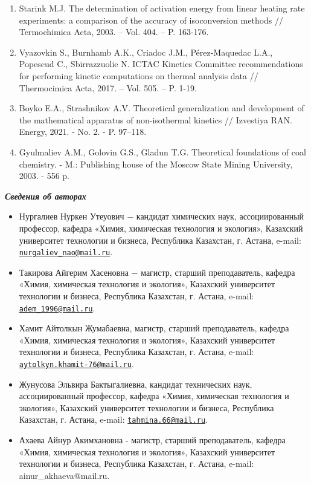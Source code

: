 \begin{enumerate}
\item
Starink M.J. The determination of activation energy from linear
heating rate experiments: a comparison of the accuracy of isoconversion
methods // Termochimica Acta, 2003. -- Vol. 404. -- P. 163-176.

\item
Vyazovkin S., Burnhamb A.K., Criadoc J.M., Pérez-Maquedac L.A.,
Popescud C., Sbirrazzuolie N. ICTAC Kinetics Committee recommendations
for performing kinetic computations on thermal analysis data //
Thermocimica Acta, 2017. -- Vol. 505. -- P. 1-19.

\item
Boyko E.A., Strashnikov A.V. Theoretical generalization and
development of the mathematical apparatus of non-isothermal kinetics //
Izvestiya RAN. Energy, 2021. - No. 2. - P. 97--118.

\item
Gyulmaliev A.M., Golovin G.S., Gladun T.G. Theoretical foundations
of coal chemistry. - M.: Publishing house of the Moscow State Mining
University, 2003. - 556 p.
\end{enumerate}

\emph{{\bfseries Сведения об авторах}}


\begin{itemize}
\item
Нургалиев Нуркен Утеуович − кандидат химических наук, ассоциированный
профессор, кафедра «Химия, химическая технология и экология», Казахский
университет технологии и бизнеса, Республика Казахстан, г. Астана,
e-mail:
\href{mailto:nurgaliev_nao@mail.ru}{\nolinkurl{nurgaliev\_nao@mail.ru}}.

\item
Такирова Айгерим Хасеновна − магистр, старший преподаватель, кафедра
«Химия, химическая технология и экология», Казахский университет
технологии и бизнеса, Республика Казахстан, г. Астана, e-mail:
\href{mailto:adem_1996@mail.ru}{\nolinkurl{adem\_1996@mail.ru}}.

\item
Хамит Айтолкын Жумабаевна, магистр, старший преподаватель, кафедра
«Химия, химическая технология и экология», Казахский университет
технологии и бизнеса, Республика Казахстан, г. Астана, e-mail:
\href{mailto:aytolkyn.khamit-76@mail.ru}{\nolinkurl{aytolkyn.khamit-76@mail.ru}}.

\item
Жунусова Эльвира Бактыгалиевна, кандидат технических наук,
ассоциированный профессор, кафедра «Химия, химическая технология и
экология», Казахский университет технологии и бизнеса, Республика
Казахстан, г. Астана, e-mail:
\href{mailto:tahmina.66@mail.ru}{\nolinkurl{tahmina.66@mail.ru}}.

\item
Ахаева Айнур Акимхановна - магистр, старший преподаватель, кафедра
«Химия, химическая технология и экология», Казахский университет
технологии и бизнеса, Республика Казахстан, г. Астана, e-mail:
ainur\_akhaeva@mail.ru.
\end{itemize}

